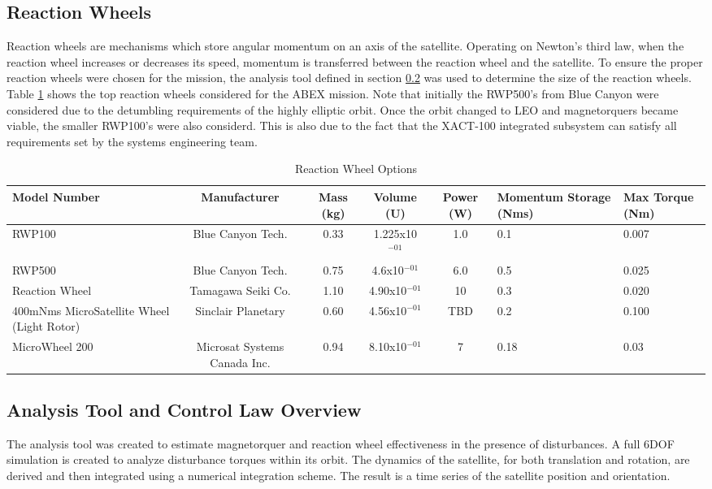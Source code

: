 \documentclass[conf]{new-aiaa}
\begin{document}
\subsection{Reaction Wheels}
Reaction wheels are mechanisms which store angular momentum on an axis of the satellite. Operating on Newton's third law, when the reaction wheel increases or decreases its speed, momentum is transferred between the reaction wheel and the satellite. To ensure the proper reaction wheels were chosen for the mission, the analysis tool defined in section \ref{s:analysis_tool} was used to determine the size of the reaction wheels. Table \ref{t:RW} shows the top reaction wheels considered for the ABEX mission. Note that initially the RWP500's from Blue Canyon were considered due to the detumbling requirements of the highly elliptic orbit. Once the orbit changed to LEO and magnetorquers became viable, the smaller RWP100's were also considerd. This is also due to the fact that the XACT-100 integrated subsystem can satisfy all requirements set by the systems engineering team. 

\begin{table}[H]
 \centering
 \caption{Reaction Wheel Options}
 \begin{tabular}[t]{|p{1.7cm}|c|c|c|c|p{1.7cm}|p{1.1cm}|}
    \hline
    \textbf{Model Number} & \textbf{Manufacturer} & \textbf{Mass (kg)} & \textbf{Volume (U)} & \textbf{Power (W)} & \textbf{Momentum Storage (Nms)} & \textbf{Max Torque (Nm)} \\
    \hline
    RWP100 \cite{RWP500}& Blue Canyon Tech.& 0.33& 1.225x10$^{-01}$& 1.0 & 0.1 & 0.007\\
    \hline
    RWP500 \cite{RWP500}& Blue Canyon Tech.& 0.75& 4.6x10$^{-01}$& 6.0 & 0.5 & 0.025\\
    \hline
    Reaction Wheel \cite{Tamagawa-RW}& Tamagawa Seiki Co.& 1.10& 4.90x10$^{-01}$& 10& 0.3& 0.020\\
    \hline
    400mNms MicroSatellite Wheel (Light Rotor) \cite{Sinclair-Light}& Sinclair Planetary& 0.60& 4.56x10$^{-01}$& TBD& 0.2& 0.100\\
    \hline
    MicroWheel 200 \cite{MSCI}& Microsat Systems Canada Inc.& 0.94& 8.10x10$^{-01}$& 7& 0.18& 0.03\\
    \hline
\end{tabular}
\label{t:RW}
\end{table}

\subsection{Analysis Tool and Control Law Overview}
\label{s:analysis_tool}
The analysis tool was created to estimate magnetorquer and reaction wheel effectiveness in the presence of disturbances. A full 6DOF simulation is created to analyze disturbance torques within its orbit. The dynamics of the satellite, for both translation and rotation, are derived and then integrated using a numerical integration scheme. The result is a time series of the satellite position and orientation.
\end{document}
